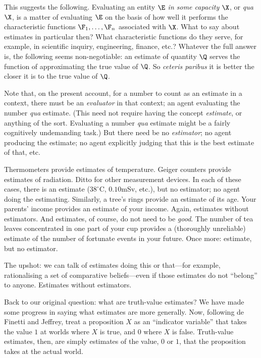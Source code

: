 This suggests the following. Evaluating an entity $\E$ \textit{in some capacity} $\X$, or \textit{qua} $\X$, is a matter of evaluating $\E$ on the basis of how well it performs the characteristic functions $\F_1,\hdots,\F_n$ associated with $\X$. What to say about estimates in particular then? What characteristic functions do they serve, for example, in scientific inquiry, engineering, finance, etc.? Whatever the full answer is, the following seems non-negotiable: an estimate of quantity $\Q$ serves the function of approximating the true value of $\Q$. So \textit{ceteris paribus} it is better the closer it is to the true value of $\Q$.

Note that, on the present account, for a number to count as an estimate in a context, there must be an \textit{evaluator} in that context; an agent evaluating the number \textit{qua} estimate. (This need not require having the concept \textit{estimate}, or anything of the sort. Evaluating a number \textit{qua} estimate might be a fairly cognitively undemanding task.) But there need be no \textit{estimator}; no agent producing the estimate; no agent explicitly judging that this is the best estimate of that, etc.

Thermometers provide estimates of temperature. Geiger counters provide estimates of radiation. Ditto for other measurement devices. In each of these cases, there is an estimate ($38^\circ$C, $0.10$mSv, etc.), but no estimator; no agent doing the estimating. Similarly, a tree's rings provide an estimate of its age. Your parents' income provides an estimate of your income. Again, estimates without estimators. And estimates, of course, do not need to be \textit{good}. The number of tea leaves concentrated in one part of your cup provides a (thoroughly unreliable) estimate of the number of fortunate events in your future. Once more: estimate, but no estimator.

The upshot: we can talk of estimates doing this or that---for example, rationalising a set of comparative beliefs---even if those estimates do not ``belong'' to anyone. Estimates without estimators.

Back to our original question: what are truth-value estimates? We have made some progress in saying what estimates are more generally. Now, following de Finetti and Jeffrey, treat a proposition $X$ as an ``indicator variable'' that takes the value $1$ at worlds where $X$ is true, and $0$ where $X$ is false. Truth-value estimates, then, are simply estimates of the value, $0$ or $1$, that the proposition takes at the actual world.

